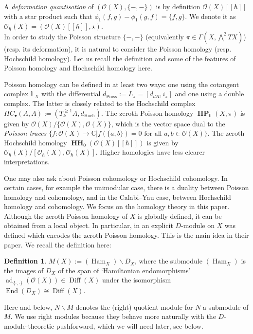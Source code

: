\documentclass[draft]{article}
\theoremstyle{definition}
\newtheorem{definition}[theorem]{Definition}
\DeclareMathOperator{\End}{{End}}
\DeclareMathOperator{\Diff}{{Diff}}
\DeclareMathOperator{\Ham}{{Ham}}
\DeclareMathOperator{\ad}{ad}
\DeclareMathOperator{\HH}{\mathbf{HH}}
\DeclareMathOperator{\HP}{\mathbf{HP}}
\newcommand{\doubleh}{[\![ \hbar ]\!]}
\newcommand{\OhX}{\mathcal{O}_\hbar(X)}
\newcommand{\OXh}{\mathcal{O}(X)\doubleh}
\begin{document}
A \textit{deformation quantisation} of $(\mathcal{O}(X),\{-,-\})$ is by definition $\OXh$ with a star product such that $\phi_1(f,g)-\phi_1(g,f)=\{f,g\}$. We denote it as $\OhX=(\OXh,\star)$.\\

In order to study the Poisson structure $\{-,-\}$ (equivalently $\pi\in\Gamma(X,\bigwedge^2 TX)$) (resp. its deformation), it is natural to consider the Poisson homology (resp. Hochschild homology). Let us recall the definition and some of the features of Poisson homology and Hochschild homology here. 

Poisson homology can be defined in at least two ways: one using the cotangent complex $\mathbb{L}_X$ with the differential $d_\text{Poiss}:=L_\pi=[d_{dR},i_\pi]$ and one using a double complex. The latter is closely related to the Hochschild complex $HC_\bullet(A,A):=(T^{\geq 1}_k A, d_\text{Hoch})$. The zeroth Poisson homology $\HP_0(X,\pi)$ is given by $\mathcal{O}(X)/\{\mathcal{O}(X),\mathcal{O}(X)\}$, which is the vector space dual to the \textit{Poisson traces} $\{f:\mathcal{O}(X)\to \mathbb{C}|f(\{a,b\})=0 \text{ for all } a,b\in \mathcal{O}(X)\}$. The zeroth Hochschild homology $\HH_0(\OXh)$ is given by $\OhX/[\OhX,\OhX]$. Higher homologies have less clearer interpretations.

One may also ask about Poisson cohomology or Hochschild cohomology. In certain cases, for example the unimodular case, there is a duality between Poisson homology and cohomology, and in the Calabi--Yau case, between Hochschild homology and cohomology. We focus on the homology theory in this paper.\\

Although the zeroth Poisson homology of $X$ is globally defined, it can be obtained from a local object. In particular, in \cite[Definition 2.2]{Poisson_Traces_and_D-Modules_on_Poisson_Varieties} an explicit $D$-module on $X$ was defined which encodes the zeroth Poisson homology. This is the main idea in their paper. We recall the definition here:

\begin{definition}
$M(X):= (\Ham_X) \backslash D_X$, where the submodule $(\Ham_X)$ is the images of $D_X$ of the span of `Hamiltonian endomorphisms' $\ad_{\{\cdot,\cdot\}}(\mathcal{O}(X))\in \Diff(X)$ under the isomorphism $\End(D_X)\cong \Diff(X)$.
\end{definition}

Here and below, $N\backslash M$ denotes the (right) quotient module for $N$ a submodule of $M$. We use right modules because they behave more naturally with the $D$-module-theoretic pushforward, which we will need later, see below.
\end{document}
